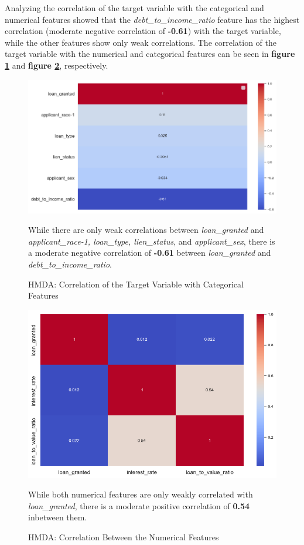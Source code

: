 Analyzing the correlation of the target variable with the categorical and numerical features showed that the \textit{debt\_to\_income\_ratio} feature has the highest correlation (moderate negative correlation of \textbf{-0.61}) with the target variable, while the other features show only weak correlations. 
The correlation of the target variable with the numerical and categorical features can be seen in \textbf{figure \ref{fig:CHXX_Target_Correlation_Categorical}} and \textbf{figure \ref{fig:CHXX_Target_Correlation_Numerical}}, respectively.

\begin{figure}[h]
    \centering
    \includegraphics[width=1\textwidth]{images/CHXX_Target_Correlation_Categorical.png}
    \caption{HMDA: Correlation of the Target Variable with Categorical Features}
    \medskip
    \small
    While there are only weak correlations between \textit{loan\_granted} and \textit{applicant\_race-1, loan\_type, lien\_status}, and \textit{applicant\_sex}, there is a moderate negative correlation of \textbf{-0.61} between \textit{loan\_granted} and \textit{debt\_to\_income\_ratio}.
    \label{fig:CHXX_Target_Correlation_Categorical}
\end{figure}

\begin{figure}[h]
    \centering
    \includegraphics[width=1\textwidth]{images/CHXX_Target_Correlation_Numerical.png}
    \caption{HMDA: Correlation Between the Numerical Features}
    \medskip
    \small
    While both numerical features are only weakly correlated with \textit{loan\_granted}, there is a moderate positive correlation of \textbf{0.54} inbetween them.
    \label{fig:CHXX_Target_Correlation_Numerical}
\end{figure}

